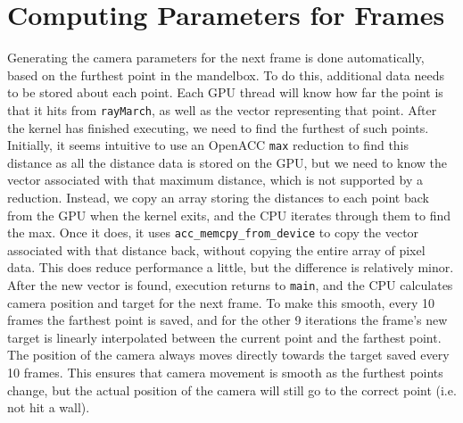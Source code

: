 \documentclass[11pt]{article}
\begin{document}

\section{Computing Parameters for Frames}\label{Sec_AutomaticNav}
Generating the camera parameters for the next frame is done automatically, based on the furthest point in the mandelbox. To do this, additional data needs to be stored about each point. Each GPU thread will know how far the point is that it hits from \texttt{rayMarch}, as well as the vector representing that point. After the kernel has finished executing, we need to find the furthest of such points. Initially, it seems intuitive to use an OpenACC \texttt{max} reduction to find this distance as all the distance data is stored on the GPU, but we need to know the vector associated with that maximum distance, which is not supported by a reduction. Instead, we copy an array storing the distances to each point back from the GPU when the kernel exits, and the CPU iterates through them to find the max. Once it does, it uses \texttt{acc\_memcpy\_from\_device} to copy the vector associated with that distance back, without copying the entire array of pixel data. This does reduce performance a little, but the difference is relatively minor.\\

After the new vector is found, execution returns to \texttt{main}, and the CPU calculates camera position and target for the next frame. To make this smooth, every 10 frames the farthest point is saved, and for the other 9 iterations the frame's new target is linearly interpolated between the current point and the farthest point. The position of the camera always moves directly towards the target saved every 10 frames. This ensures that camera movement is smooth as the furthest points change, but the actual position of the camera will still go to the correct point (i.e. not hit a wall).
\end{document}
